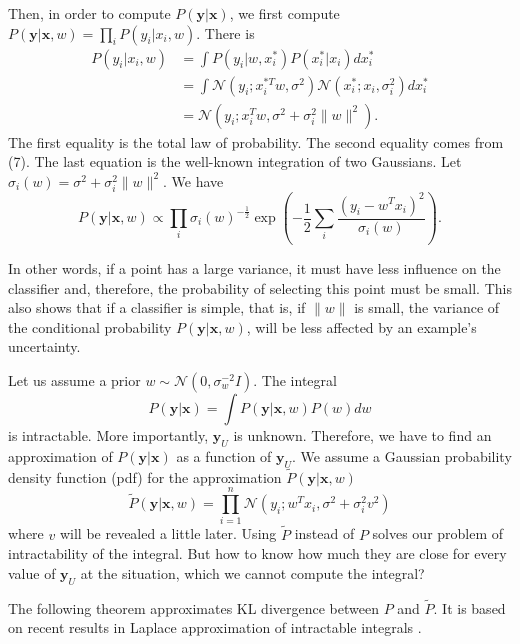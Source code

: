 \documentclass[10pt,twocolumn]{IEEEtran}
\begin{document}
	Then, in order to compute $P(\mathbf{y}|\mathbf{x})$, we first compute $P(\mathbf{y}|\mathbf{x}, w) = \prod_i P(y_i|x_i, w)$. There is
	\begin{align}
		P(y_i|x_i, w) &= \int P(y_i|w, x_i^*) P(x_i^*|x_i) dx_i^* \\
		&= \int \mathcal{N}(y_i; x_i^{*T} w, \sigma^2) \mathcal{N}(x_i^*; x_i, \sigma_i^2) dx_i^* \\
		&= \mathcal{N}(y_i; x_i^T w, \sigma^2 + \sigma_i^2 \|w\|^2).
	\end{align}
	The first equality is the total law of probability. The second equality comes from (7). The last equation is the well-known integration of two Gaussians. Let $\sigma_i(w) = \sigma^2 + \sigma_i^2 \|w\|^2$. We have
	\begin{equation}
		P(\mathbf{y}|\mathbf{x}, w) \propto \prod_i \sigma_i(w)^{-\frac12} \exp\left( -\frac12 \sum_i \frac{(y_i - w^T x_i)^2}{\sigma_i(w)} \right).
	\end{equation}
	
	In other words, if a point has a large variance, it must have less influence on the classifier and, therefore, the probability of selecting this point must be small. This also shows that if a classifier is simple, that is, if $\|w\|$ is small, the variance of the conditional probability $P(\mathbf{y}|\mathbf{x}, w)$, will be less affected by an example's uncertainty.
	
	Let us assume a prior $w \sim \mathcal{N}(0, \sigma_w^{-2} I)$. The integral
	\begin{equation}
		P(\mathbf{y}|\mathbf{x}) = \int P(\mathbf{y}|\mathbf{x}, w) P(w) dw
	\end{equation}
	is intractable. More importantly, $\mathbf{y}_U$ is unknown. Therefore, we have to find an approximation of $P(\mathbf{y}|\mathbf{x})$ as a function of $\mathbf{y}_U$. We assume a Gaussian probability density function (pdf) for the approximation $\tilde{P}(\mathbf{y}|\mathbf{x}, w)$
	\begin{equation}
		\tilde{P}(\mathbf{y}|\mathbf{x}, w) = \prod_{i=1}^n \mathcal{N}(y_i; w^T x_i, \sigma^2 + \sigma_i^2 v^2)
	\end{equation}
	where $v$ will be revealed a little later. Using $\tilde{P}$ instead of $P$ solves our problem of intractability of the integral. But how to know how much they are close for every value of $\mathbf{y}_U$ at the situation, which we cannot compute the integral?
	
	The following theorem approximates KL divergence between $P$ and $\tilde{P}$. It is based on recent results in Laplace approximation of intractable integrals \cite{wong2001asymptotic, lapinski2019multivariate, inglot2014simple}.
	
\end{document}
